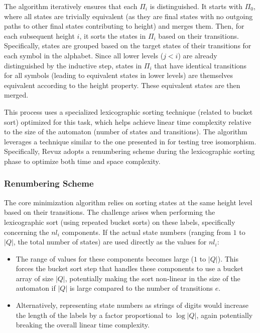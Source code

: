 The algorithm iteratively ensures that each $\Pi_i$ is distinguished. It starts with $\Pi_0$, where all states are trivially equivalent (as they are final states with no outgoing paths to other final states contributing to height) and merges them. Then, for each subsequent height $i$, it sorts the states in $\Pi_i$ based on their transitions. Specifically, states are grouped based on the target states of their transitions for each symbol in the alphabet. Since all lower levels ($j < i$) are already distinguished by the inductive step, states in $\Pi_i$ that have identical transitions for all symbols (leading to equivalent states in lower levels) are themselves equivalent according to the height property. These equivalent states are then merged.

This process uses a specialized lexicographic sorting technique (related to bucket sort) optimized for this task, which helps achieve linear time complexity relative to the size of the automaton (number of states and transitions). The algorithm leverages a technique similar to the one presented in \cite{aho1974design} for testing tree isomorphism. Specifically, Revuz adopts a renumbering scheme during the lexicographic sorting phase to optimize both time and space complexity. 

\subsubsection{Renumbering Scheme}
The core minimization algorithm relies on sorting states at the same height level based on their transitions. The challenge arises when performing the lexicographic sort (using repeated bucket sorts) on these labels, specifically concerning the $nl_i$ components. If the actual state numbers (ranging from $1$ to $|Q|$, the total number of states) are used directly as the values for $nl_i$:
\begin{itemize}
    \item The range of values for these components becomes large ($1$ to $|Q|$). This forces the bucket sort step that handles these components to use a bucket array of size $|Q|$, potentially making the sort non-linear in the size of the automaton if $|Q|$ is large compared to the number of transitions $e$.
    \item Alternatively, representing state numbers as strings of digits would increase the length of the labels by a factor proportional to $\log |Q|$, again potentially breaking the overall linear time complexity.
\end{itemize}

